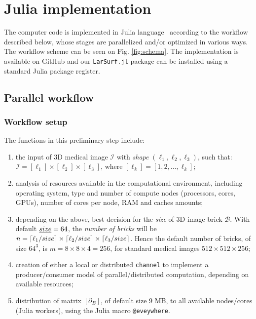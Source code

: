 
\section{Julia implementation}\label{sec:julia}

The computer code is implemented in Julia language~\cite{BEKS14} according to the workflow described below, whose stages are parallelized and/or optimized in various ways. The workflow scheme can be seen on Fig. \ref{fig:schema}. The implementation is available on GitHub \cite{larsurf-github} and our \texttt{LarSurf.jl} package can be installed using a standard Julia package register.

\subsection{Parallel workflow}\label{sec:implementation}


\subsubsection*{Workflow setup}\label{sec:workflow}
The functions in this preliminary step include:
\begin{enumerate}

\item the input of 3D medical image $\mathcal{I}$ with \emph{shape} $(\ell_1, \ell_2, \ell_3)$, such that: $\mathcal{I} = [\ell_1]\times[\ell_2]\times[\ell_3]$, where $[\ell_k] = [1,2,\ldots,\ell_k]$;

\item analysis of resources available in the computational environment, including operating system, type and number of compute nodes (processors, cores, GPUs), number of cores per node, RAM and caches amounts;

\item depending on the above, best decision for the \emph{size} of 3D image brick $\mathcal{B}$. With default $\emph{size}=64$,  the \emph{number of bricks} will be $n=\left\lceil \ell_1/size \right\rceil\times\left\lceil \ell_2/size \right\rceil\times\left\lceil \ell_3/size \right\rceil$. 
Hence the default number of bricks, of size $64^3$, is $m=8\times 8\times 4 = 256$, for standard medical images $512\times 512\times 256$;


\item creation of either a local or distributed \texttt{channel} to implement a producer/consumer model of parallel/distributed computation, depending on available resources;

\item distribution of matrix $[\partial_B]$, of default size $9$ MB, to all available nodes/cores (Julia workers), using the Julia macro \texttt{@eveywhere}. 

\end{enumerate}

